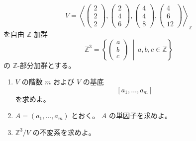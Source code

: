 
\begin{exercise}
	\[
	V=
	\left\langle
	\begin{pmatrix}
		2\\
		2\\
		2
	\end{pmatrix},
	\begin{pmatrix}
		2\\
		4\\
		6
	\end{pmatrix},
	\begin{pmatrix}
		4\\
		4\\
		8
	\end{pmatrix},
	\begin{pmatrix}
		4\\
		6\\
		12
	\end{pmatrix}
	\right\rangle_{\mathbb{Z}}
	\]
	を自由 \(\mathbb{Z}\)-加群
	\[
	\mathbb{Z}^3
	=
	\left\{
	\begin{pmatrix}
		a\\
		b\\
		c
	\end{pmatrix}
	\ \middle|\ 
	a,b,c\in\mathbb{Z}
	\right\}
	\]
	の \(\mathbb{Z}\)-部分加群とする。
	
	\begin{enumerate}
		\item
		\(V\) の階数 \(m\) および \(V\) の基底
		\[
		[a_1,\ldots,a_m]
		\]
		を求めよ。
		
		\item
		\(A=(a_1,\ldots,a_m)\) とおく。
		\(A\) の単因子を求めよ。
		
		\item
		\(\mathbb{Z}^3/V\) の不変系を求めよ。
	\end{enumerate}
\end{exercise}

